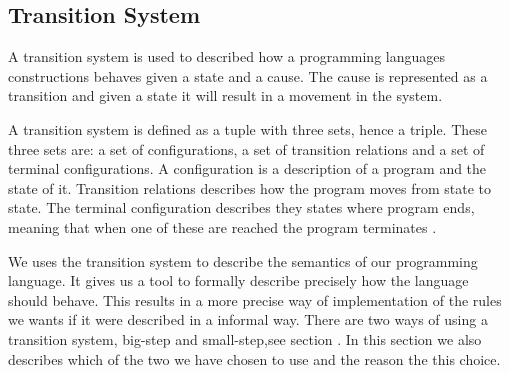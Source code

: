 \subsection{Transition System}
A transition system is used to described how a programming languages constructions behaves given a state and a cause. The cause is represented as a transition and given a state it will result in a movement in the system.

A transition system is defined as a tuple with three sets, hence a triple. These three sets are: a set of configurations, a set of transition relations and a set of terminal configurations.
A configuration is a description of a program and the state of it. Transition relations describes how the program moves from state to state. The terminal configuration describes they states where program ends, meaning that when one of these are reached the program terminates \citep{HHTree}.

We uses the transition system to describe the semantics of our programming language. It gives us a tool to formally describe precisely how the language should behave. This results in a more precise way of implementation of the rules we wants if it were described in a informal way. There are two ways of using a transition system, big-step and small-step,see section . In this section we also describes which of the two we have chosen to use and the reason the this choice.